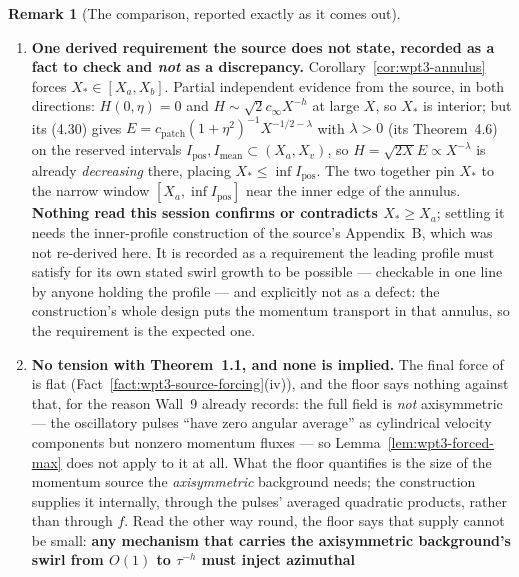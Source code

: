 \documentclass[11pt]{article}
\theoremstyle{definition}
\newtheorem{remark}[theorem]{Remark}
\theoremstyle{remark}
\begin{document}
\begin{remark}[The comparison, reported exactly as it comes out]
\begin{enumerate}[label=(\alph*),leftmargin=2.2em]
      Wall~9's ``load-bearing, not decorative'' can now be quoted with a
      number: \textbf{$\tau^{-(A+1)}$ pointwise at the swirl maximum, i.e.\
      full leading order in the $\theta$-momentum equation}
      (Remark~\ref{rem:wpt3-calibration}).
    \item \textbf{One derived requirement the source does not state, recorded
      as a fact to check and \emph{not} as a discrepancy.}
      Corollary~\ref{cor:wpt3-annulus} forces $X_*\in[X_a,X_b]$. Partial
      independent evidence from the source, in both directions: $H(0,\eta)=0$
      and $H\sim\sqrt2c_\infty X^{-h}$ at large $X$, so $X_*$ is interior;
      but its (4.30) gives $E=c_{\mathrm{patch}}(1+\eta^2)^{-1}X^{-1/2-\lambda}$
      with $\lambda>0$ (its Theorem~4.6) on the reserved intervals
      $I_{\mathrm{pos}},I_{\mathrm{mean}}\subset(X_a,X_v)$, so
      $H=\sqrt{2X}E\propto X^{-\lambda}$ is already \emph{decreasing} there,
      placing $X_*\leq\inf I_{\mathrm{pos}}$. The two together pin $X_*$ to
      the narrow window $[X_a,\inf I_{\mathrm{pos}}]$ near the inner edge of
      the annulus. \textbf{Nothing read this session confirms or contradicts
      $X_*\geq X_a$}; settling it needs the inner-profile construction of the
      source's Appendix~B, which was not re-derived here. It is recorded as a
      requirement the leading profile must satisfy for its own stated swirl
      growth to be possible --- checkable in one line by anyone holding the
      profile --- and explicitly not as a defect: the construction's whole
      design puts the momentum transport in that annulus, so the requirement
      is the expected one.
    \item \textbf{No tension with Theorem~1.1, and none is implied.} The
      final force of \cite{OpenAI2026} is flat
      (Fact~\ref{fact:wpt3-source-forcing}(iv)), and the floor says nothing
      against that, for the reason Wall~9 already records: the full field is
      \emph{not} axisymmetric --- the oscillatory pulses ``have zero angular
      average'' as cylindrical velocity components but nonzero momentum
      fluxes --- so Lemma~\ref{lem:wpt3-forced-max} does not apply to it at
      all. What the floor quantifies is the size of the momentum source the
      \emph{axisymmetric} background needs; the construction supplies it
      internally, through the pulses' averaged quadratic products, rather
      than through $f$. Read the other way round, the floor says that supply
      cannot be small: \textbf{any mechanism that carries the axisymmetric
      background's swirl from $O(1)$ to $\tau^{-h}$ must inject azimuthal
}
\end{enumerate}
\end{remark}
\end{document}
